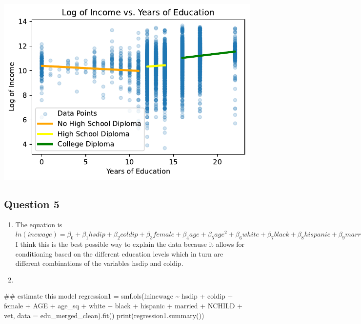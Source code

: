 \documentclass[
  letterpaper,
  DIV=11,
  numbers=noendperiod]{scrartcl}
\newenvironment{Shaded}{\begin{snugshade}}{\end{snugshade}}
\newcommand{\BuiltInTok}[1]{\textcolor[rgb]{0.00,0.23,0.31}{#1}}
\newcommand{\CommentTok}[1]{\textcolor[rgb]{0.37,0.37,0.37}{#1}}
\newcommand{\NormalTok}[1]{\textcolor[rgb]{0.00,0.23,0.31}{#1}}
\newcommand{\OperatorTok}[1]{\textcolor[rgb]{0.37,0.37,0.37}{#1}}
\newcommand{\StringTok}[1]{\textcolor[rgb]{0.13,0.47,0.30}{#1}}
\begin{document}
\includegraphics{mini-lesson-1_files/figure-pdf/cell-14-output-1.pdf}

\subsection{Question 5}\label{question-5}

\begin{enumerate}
\def\labelenumi{\alph{enumi}.}
\item
  The equation is
  \(ln(incwage)= \beta_{0} + \beta_{1}hsdip + \beta_{2}coldip +\beta_{3}female+\beta_{4}age+\beta_{5}age^2+\beta_{6}white+\beta_{7}black+\beta_{8}hispanic+\beta_{9}married+\beta_{10}nchild+\beta_{11}vet+\varepsilon\)
  I think this is the best possible way to explain the data because it
  allows for conditioning based on the different education levels which
  in turn are different combinations of the variables hsdip and coldip.
\item
\end{enumerate}

\begin{Shaded}
\begin{Highlighting}[]
\CommentTok{\#\# estimate this model }
\NormalTok{regression1 }\OperatorTok{=}\NormalTok{ smf.ols(}\StringTok{\textquotesingle{}lnincwage \textasciitilde{} hsdip + coldip + female + AGE + age\_sq + white + black + hispanic + married + NCHILD + vet\textquotesingle{}}\NormalTok{, data }\OperatorTok{=}\NormalTok{ edu\_merged\_clean).fit()}
\BuiltInTok{print}\NormalTok{(regression1.summary())}
\end{Highlighting}
\end{Shaded}
\end{document}
